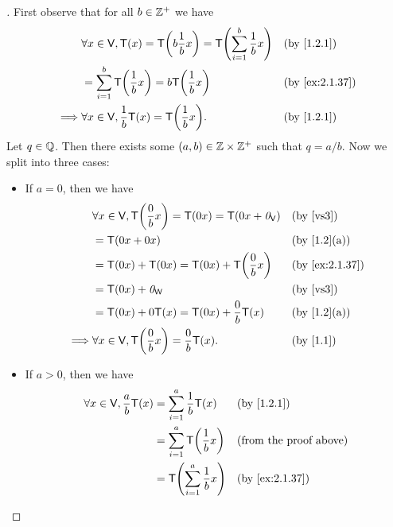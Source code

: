 \begin{proof}[]
  First observe that for all \(b \in \mathbb{Z}^+\) we have
  \begin{align*}
             & \forall x \in \V, \T(x) = \T\pa{b \frac{1}{b} x} = \T\pa{\sum_{i = 1}^b \frac{1}{b} x} &  & \by{1.2.1}     \\
             & = \sum_{i = 1}^b \T\pa{\frac{1}{b} x} = b \T\pa{\frac{1}{b} x}                         &  & \by{ex:2.1.37} \\
    \implies & \forall x \in \V, \frac{1}{b} \T(x) = \T\pa{\frac{1}{b} x}.                            &  & \by{1.2.1}
  \end{align*}
  Let \(q \in \mathbb{Q}\).
  Then there exists some \((a, b) \in \mathbb{Z} \times \mathbb{Z}^+\) such that \(q = a / b\).
  Now we split into three cases:
  \begin{itemize}
    \item If \(a = 0\), then we have
          \begin{align*}
                     & \forall x \in \V, \T\pa{\frac{0}{b} x} = \T(0x) = \T(0x + \zv_{\V}) &  & \text{(by \ref{vs3})} \\
                     & = \T(0x + 0x)                                                       &  & \by{1.2}[a]           \\
                     & = \T(0x) + \T(0x) = \T(0x) + \T\pa{\frac{0}{b} x}                   &  & \by{ex:2.1.37}        \\
                     & = \T(0x) + \zv_{\W}                                                 &  & \text{(by \ref{vs3})} \\
                     & = \T(0x) + 0 \T(x) = \T(0x) + \frac{0}{b} \T(x)                     &  & \by{1.2}[a]           \\
            \implies & \forall x \in \V, \T\pa{\frac{0}{b}x} = \frac{0}{b} \T(x).          &  & \by{1.1}
          \end{align*}
    \item If \(a > 0\), then we have
          \begin{align*}
            \forall x \in \V, \frac{a}{b} \T(x) & = \sum_{i = 1}^a \frac{1}{b} \T(x)    &  & \by{1.2.1}                    \\
                                                & = \sum_{i = 1}^a \T\pa{\frac{1}{b} x} &  & \text{(from the proof above)} \\
                                                & = \T\pa{\sum_{i = 1}^a \frac{1}{b} x} &  & \by{ex:2.1.37}                \\

\end{align*}
\end{itemize}
\end{proof}

